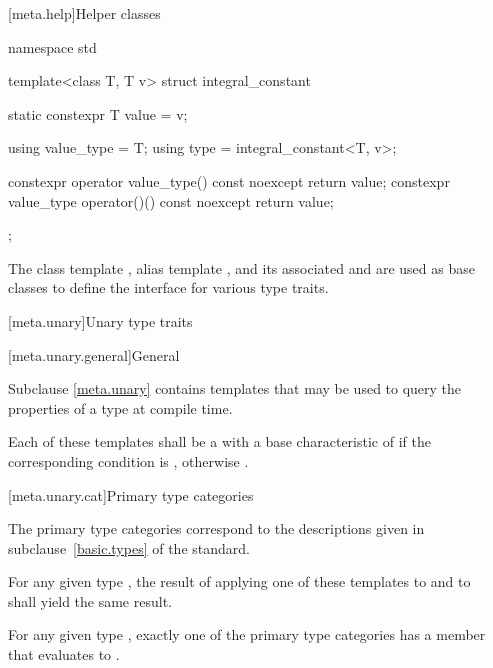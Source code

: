 [meta.help]{Helper classes}

%
\begin{codeblock}
namespace std {
  template<class T, T v> struct integral_constant {
    static constexpr T value = v;

    using value_type = T;
    using type = integral_constant<T, v>;

    constexpr operator value_type() const noexcept { return value; }
    constexpr value_type operator()() const noexcept { return value; }
  };
}
\end{codeblock}

%
%
%
%
\pnum
The class template ,
alias template , and
its associated 
 and 
are used as base classes to define
the interface for various type traits.

[meta.unary]{Unary type traits}

[meta.unary.general]{General}

\pnum
Subclause \ref{meta.unary} contains templates that may be used to query the
properties of a type at compile time.

\pnum
Each of these templates shall be a
with a base characteristic of
 if the corresponding condition is , otherwise
.

[meta.unary.cat]{Primary type categories}

\pnum
The primary type categories correspond to the descriptions given in
subclause~\ref{basic.types} of the \Cpp{} standard.

\pnum
For any given type , the result of applying one of these templates to
 and to \cv{}~ shall yield the same result.

\pnum
\begin{note}
For any given type , exactly one of the primary type categories
has a  member that evaluates to .
\end{note}

